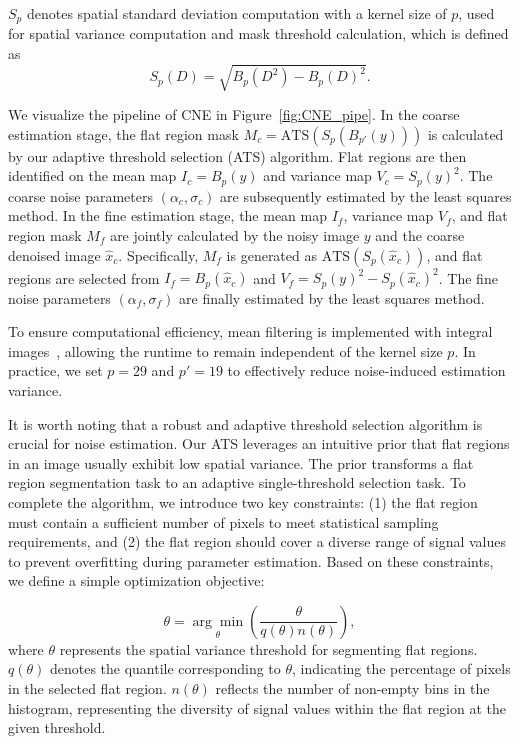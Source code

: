 \documentclass[lettersize,journal]{IEEEtran}
\begin{document}
	\(S_p\) denotes spatial standard deviation computation with a kernel size of \(p\), used for spatial variance computation and mask threshold calculation, which is defined as
	\begin{equation}
		S_p(D) = \sqrt{B_p(D^2) - B_p(D)^2}.
	\end{equation}
	
	We visualize the pipeline of CNE in Figure~\ref{fig:CNE_pipe}.
	In the coarse estimation stage, the flat region mask \(M_c=\text{ATS}\left(S_{p}(B_{p{'}}(y))\right)\) is calculated by our adaptive threshold selection (ATS) algorithm. Flat regions are then identified on the mean map \(I_c=B_{p}(y)\) and variance map \(V_c=S_{p}(y)^2\). The coarse noise parameters \((\alpha_c, \sigma_c)\) are subsequently estimated by the least squares method. 
	In the fine estimation stage, the mean map \(I_f\), variance map \(V_f\), and flat region mask \(M_f\) are jointly calculated by the noisy image \(y\) and the coarse denoised image \(\hat{x}_c\). Specifically, \(M_f\) is generated as \(\text{ATS}\left(S_{p}(\hat{x}_c)\right)\), and flat regions are selected from \(I_f=B_{p}(\hat{x}_c)\) and \(V_f=S_{p}(y)^2-S_{p}(\hat{x}_c)^2\). The fine noise parameters \((\alpha_f, \sigma_f)\) are finally estimated by the least squares method. 
	
	To ensure computational efficiency, mean filtering is implemented with integral images~\cite{boxfilter}, allowing the runtime to remain independent of the kernel size \(p\). In practice, we set \(p=29\) and \(p'=19\) to effectively reduce noise-induced estimation variance.  
	
	It is worth noting that a robust and adaptive threshold selection algorithm is crucial for noise estimation. Our ATS leverages an intuitive prior that flat regions in an image usually exhibit low spatial variance. The prior transforms a flat region segmentation task to an adaptive single-threshold selection task.	
	To complete the algorithm, we introduce two key constraints: (1) the flat region must contain a sufficient number of pixels to meet statistical sampling requirements, and (2) the flat region should cover a diverse range of signal values to prevent overfitting during parameter estimation. 
	Based on these constraints, we define a simple optimization objective:
	
	\begin{equation}\label{eq:ATS}
		\theta = \underset{\theta}{\arg\min} \left(\frac{\theta}{q(\theta) n(\theta)}\right),
	\end{equation}
	where \(\theta\) represents the spatial variance threshold for segmenting flat regions. \(q(\theta)\) denotes the quantile corresponding to \(\theta\), indicating the percentage of pixels in the selected flat region. \(n(\theta)\) reflects the number of non-empty bins in the histogram, representing the diversity of signal values within the flat region at the given threshold.
	
\end{document}
